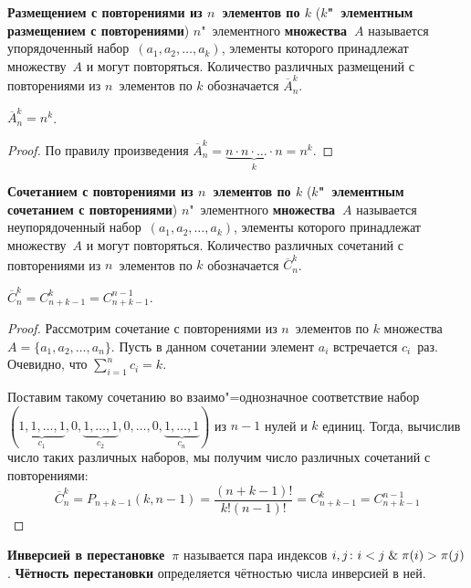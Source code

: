  \textbf{Размещением с повторениями из $n$~элементов по $k$} (\textbf{$k$"~элементным размещением с повторениями}) $n$"~элементного \textbf{множества~$A$} называется упорядоченный набор~$(a_1, a_2, \ldots, a_k)$, элементы которого принадлежат множеству~$A$ и могут повторяться.
Количество различных размещений с повторениями из $n$~элементов по $k$ обозначается $\overline A_n^k$.

\begin{statement}
$\overline A_n^k = n^k$.
\end{statement}
\begin{proof}
По правилу произведения $\overline A_n^k = \underbrace{n \cdot n \cdot \ldots \cdot n}_k = n^k$.
\end{proof}

 \textbf{Сочетанием с повторениями из $n$~элементов по $k$} (\textbf{$k$"~элементным сочетанием с повторениями}) $n$"~элементного \textbf{множества~$A$} называется неупорядоченный набор~$(a_1, a_2, \ldots, a_k)$, элементы которого принадлежат множеству~$A$ и могут повторяться.
Количество различных сочетаний с повторениями из $n$~элементов по $k$ обозначается $\overline C_n^k$.

\begin{statement}
$\overline C_n^k = C_{n+k-1}^k = C_{n+k-1}^{n-1}$.
\end{statement}
\begin{proof}
Рассмотрим сочетание с повторениями из $n$~элементов по $k$ множества $A = \{ a_1, a_2, \ldots, a_n \}$.
Пусть в данном сочетании элемент $a_i$ встречается $c_i$~раз.
Очевидно, что $\sum\limits_{i=1}^n c_i = k$.

Поставим такому сочетанию во взаимо"=однозначное соответствие набор $(\underbrace{1, 1, \ldots, 1}_{c_1}, 0, \underbrace{1, \ldots, 1}_{c_2}, 0, \ldots, 0, \underbrace{1, \ldots, 1}_{c_n})$ из $n - 1$ нулей и $k$ единиц.
Тогда, вычислив число таких различных наборов, мы получим число различных сочетаний с повторениями:
\begin{equation*}
\overline C_n^k = P_{n + k - 1}(k, n - 1) = \frac{(n + k - 1)!}{k!(n - 1)!} = C_{n+k-1}^k = C_{n+k-1}^{n-1}
\end{equation*}
\end{proof}

 \textbf{Инверсией в перестановке~$\pi$} называется пара индексов $i, j \colon i < j \mathrel{\&} \pi(i) > \pi(j)$.
\textbf{Чётность перестановки} определяется чётностью числа инверсией в ней.


